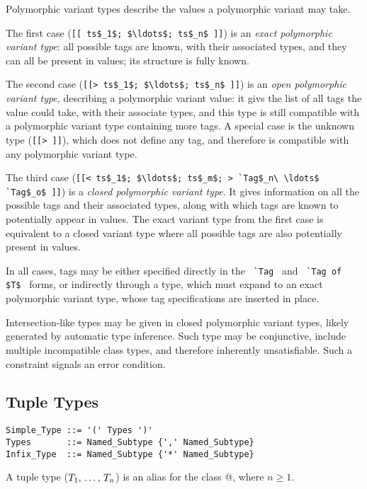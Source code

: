 Polymorphic variant types describe the values a polymorphic variant may take. 

The first case (\lstinline![[ ts$_1$; $\ldots$; ts$_n$ ]]!) is an {\em exact polymorphic variant type}: all possible tags are known, with their associated types, and they can all be present in values; its structure is fully known. 

The second case (\lstinline![[> ts$_1$; $\ldots$; ts$_n$ ]]!) is an {\em open polymorphic variant type}, describing a polymorphic variant value: it givs the list of all tags the value could take, with their associate types, and this type is still compatible with a polymorphic variant type containing more tags. A special case is the unknown type (\lstinline![[> ]]!), which does not define any tag, and therefore is compatible with any polymorphic variant type. 

The third case (\lstinline![[< ts$_1$; $\ldots$; ts$_m$; > `Tag$_n\ \ldots$ `Tag$_o$ ]]!) is a {\em closed polymorphic variant type}. It gives information on all the possible tags and their associated types, along with which tags are known to potentially appear in values. The exact variant type from the first case is equivalent to a closed variant type where all possible tags are also potentially present in values. 

In all cases, tags may be either specified directly in the ~\lstinline!`Tag!~ and ~\lstinline!`Tag of $T$!~ forms, or indirectly through a type, which must expand to an exact polymorphic variant type, whose tag specifications are inserted in place. 

Intersection-like types may be given in closed polymorphic variant types, likely generated by automatic type inference. Such type may be conjunctive, include multiple incompatible class types, and therefore inherently unsatisfiable. Such a constraint signals an error condition. 





\subsection{Tuple Types}
\label{sec:tuple-types}

\syntax\begin{lstlisting}
Simple_Type ::= '(' Types ')'
Types       ::= Named_Subtype {',' Named_Subtype}
Infix_Type  ::= Named_Subtype {'*' Named_Subtype}
\end{lstlisting}

A tuple type ($T_1 \commadots T_n$) is an alias for the class \lstinline@Tuple[$T_1 \commadots T_n$]@, where $n \geq 1$. 

